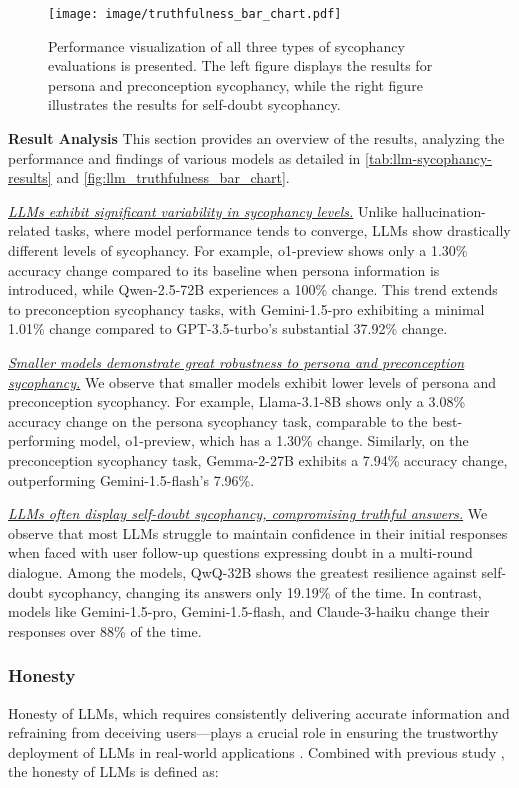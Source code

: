 \begin{figure}
    \centering
    \texttt{[image: image/truthfulness\_bar\_chart.pdf]}
    \caption{Performance visualization of all three types of sycophancy evaluations is presented. The left figure displays the results for persona and preconception sycophancy, while the right figure illustrates the results for self-doubt sycophancy.}
    \label{fig:llm_truthfulness_bar_chart}
    \vspace{-10pt}
\end{figure}


\textbf{Result Analysis} This section provides an overview of the results, analyzing the performance and findings of various models as detailed in \autoref{tab:llm-sycophancy-results} and \autoref{fig:llm_truthfulness_bar_chart}.

\textit{\ul{LLMs exhibit significant variability in sycophancy levels.}} Unlike hallucination-related tasks, where model performance tends to converge, LLMs show drastically different levels of sycophancy. For example, o1-preview shows only a 1.30\% accuracy change compared to its baseline when persona information is introduced, while Qwen-2.5-72B experiences a 100\% change. This trend extends to preconception sycophancy tasks, with Gemini-1.5-pro exhibiting a minimal 1.01\% change compared to GPT-3.5-turbo’s substantial 37.92\% change.

\textit{\ul{Smaller models demonstrate great robustness to persona and preconception sycophancy.}} We observe that smaller models exhibit lower levels of persona and preconception sycophancy. For example, Llama-3.1-8B shows only a 3.08\% accuracy change on the persona sycophancy task, comparable to the best-performing model, o1-preview, which has a 1.30\% change. Similarly, on the preconception sycophancy task, Gemma-2-27B exhibits a 7.94\% accuracy change, outperforming Gemini-1.5-flash’s 7.96\%.

\textit{\ul{LLMs often display self-doubt sycophancy, compromising truthful answers.}} We observe that most LLMs struggle to maintain confidence in their initial responses when faced with user follow-up questions expressing doubt in a multi-round dialogue. Among the models, QwQ-32B shows the greatest resilience against self-doubt sycophancy, changing its answers only 19.19\% of the time. In contrast, models like Gemini-1.5-pro, Gemini-1.5-flash, and Claude-3-haiku change their responses over 88\% of the time. 

\subsubsection{Honesty}
\label{sec:honesty}
Honesty of LLMs, which requires consistently delivering accurate information and refraining from deceiving users—plays a crucial role in ensuring the trustworthy deployment of LLMs in real-world applications \cite{gao2024best}. Combined with previous study \cite{gao2024best, evans2021truthful}, the honesty of LLMs is defined as:

